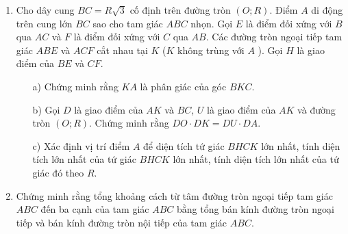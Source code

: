 \begin{ex}%
    \begin{enumerate}[1)]
        \item Cho dây cung $BC=R\sqrt{3}$ cố định trên đường tròn $(O;R).$ Điểm $A$ di động trên cung lớn $BC$ sao cho tam giác $ABC$ nhọn. Gọi $E$ là điểm đối xứng với $B$ qua $AC$ và $F$ là điểm đối xứng với $C$ qua $AB.$ Các đường tròn ngoại tiếp tam giác $ABE$ và $ACF$ cắt nhau tại $K$ ($K$ không trùng với $A$ ). Gọi $H$ là giao điểm của $BE$ và $CF$.
        \begin{itemize}
        \item[a)] Chứng minh rằng $KA$ là phân giác của góc $BKC.$
        \item[b)] Gọi $D$ là giao điểm của $AK$ và $BC$, $U$ là giao điểm của $AK$ và đường tròn $(O;R).$  Chứng minh rằng $DO\cdot DK=DU\cdot DA.$
        \item[c)] Xác định vị trí điểm $A$  để diện tích tứ giác $BHCK$ lớn nhất, tính diện tích lớn nhất của tứ giác $BHCK$ lớn nhất, tính diện tích lớn nhất của tứ giác đó theo $R.$
        \end{itemize}
        \item Chứng minh rằng tổng khoảng cách từ tâm đường tròn ngoại tiếp tam giác $ABC$  đến ba cạnh của tam giác $ABC$ bằng tổng bán kính đường tròn ngoại tiếp và bán kính đường tròn nội tiếp của tam giác $ABC.$
    \end{enumerate}
\loigiai{

}
\end{ex}
